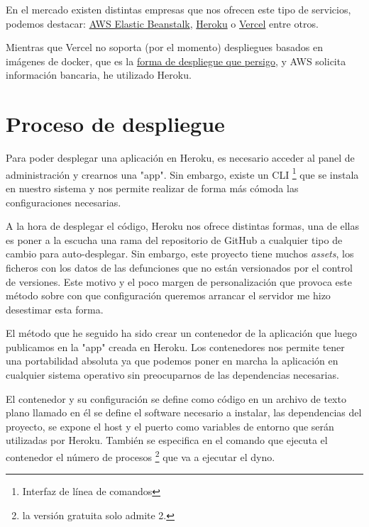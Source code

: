 En el mercado existen distintas empresas que nos ofrecen este tipo de servicios, podemos
destacar: \href{https://aws.amazon.com/es/elasticbeanstalk/}{AWS Elastic Beanstalk},
\href{https://dashboard.heroku.com/login}{Heroku} o \href{https://vercel.com/}{Vercel}
entre otros.

Mientras que Vercel no soporta (por el momento) despliegues basados en imágenes de docker,
que es la \hyperref[sec:proceso-despliegue]{forma de despliegue que persigo}, y AWS
solicita información bancaria, he utilizado Heroku.

\section{Proceso de despliegue}
\label{sec:proceso-despliegue}
Para poder desplegar una aplicación en Heroku, es necesario acceder al panel de
administración y crearnos una "app". Sin embargo, existe un CLI \footnote{Interfaz de
línea de comandos} que se instala en nuestro sistema y nos permite realizar de forma más
cómoda las configuraciones necesarias.

A la hora de desplegar el código, Heroku nos ofrece distintas formas, una de ellas es
poner a la escucha una rama del repositorio de GitHub a cualquier tipo de cambio para
auto-desplegar. Sin embargo, este proyecto tiene muchos \textit{assets}, los ficheros con
los datos de las defunciones que no están versionados por el control de versiones. Este
motivo y el poco margen de personalización que provoca este método sobre con que
configuración queremos arrancar el servidor me hizo desestimar esta forma.

El método que he seguido ha sido crear un contenedor de la aplicación que luego publicamos
en la "app" creada en Heroku. Los contenedores nos permite tener una portabilidad absoluta
ya que podemos poner en marcha la aplicación en cualquier sistema operativo sin
preocuparnos de las dependencias necesarias.

El contenedor y su configuración se define como código en un archivo de texto plano
llamado  en él se define el software necesario a instalar, las
dependencias del proyecto, se expone el host y el puerto como variables de entorno que
serán utilizadas por Heroku. También se especifica en el comando que ejecuta el contenedor
el número de procesos \footnote{la versión gratuita solo admite 2.} que va a ejecutar el
dyno. 

